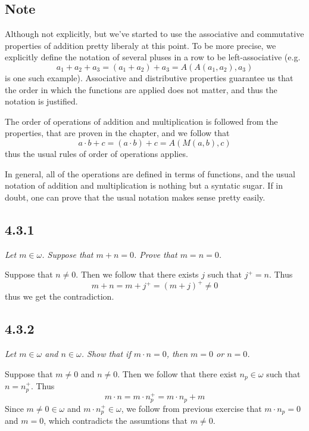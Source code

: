 \documentclass[11pt,oneside,titlepage]{book}
\begin{document}
\subsection*{Note}

Although not explicitly, but we've started to use the associative and commutative
properties of addition pretty liberaly at this point. To be more precise,
we explicitly define the notation of several pluses in a row to be left-associative (e.g.
$$a_1 + a_2 + a_3 = (a_1 + a_2) + a_3 = A(A(a_1, a_2), a_3) $$
is one such example). Associative and distributive properties guarantee us that the order in
which the functions are applied does not matter, and thus the notation is justified.

The order of operations of addition and multiplication is followed from the properties,
that are proven in the chapter, and we follow that
$$a \cdot b + c = (a \cdot b) + c = A(M(a, b), c)$$
thus the usual rules of order of operations applies.

In general, all of the operations are defined in terms of functions, and the usual notation
of addition and multiplication is nothing but a syntatic sugar. If in doubt, one can
prove that the usual notation makes sense pretty easily.

\subsection*{4.3.1}

\textit{Let $m \in \omega$. Suppose that $m + n = 0$. Prove that $m = n = 0$.}

Suppose that $n \neq 0$. Then we follow that there exists $j$ such that $j^+ = n$. Thus
$$m + n = m + j^+ = (m + j)^+ \neq 0$$
thus we get the contradiction.

\subsection*{4.3.2}

\textit{Let $m \in \omega$ and $n \in \omega$. Show that if $m \cdot n = 0$, then $m = 0$ or
  $n = 0$.}

Suppose that $m \neq 0$ and $n \neq 0$. Then we follow that there exist $n_p \in \omega$
such that $n = n_p^+$. Thus
$$m \cdot n = m \cdot n_p^+ = m \cdot n_p +  m$$
Since $m \neq 0 \in \omega$ and $m \cdot n_p^+ \in \omega$, we follow from previous exercise
that $m \cdot n_p = 0$ and $m = 0$, which contradicts the assumtions that $m \neq 0$.
\end{document}
